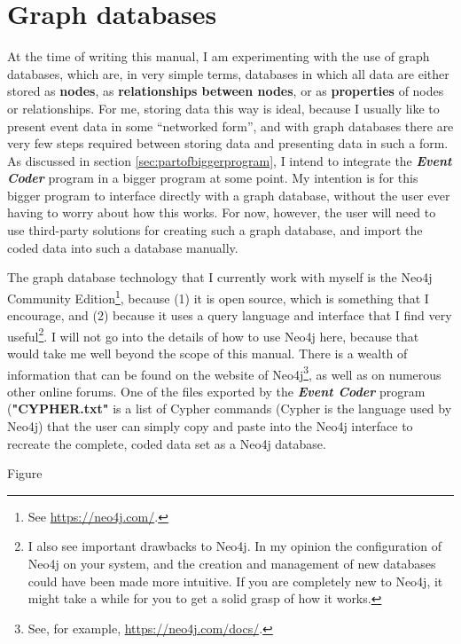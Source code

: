 \documentclass{memoir}
\begin{document}
\section{Graph databases}
\label{sec:graphdatabases}

At the time of writing this manual, I am experimenting with the use of graph databases, which are, in very simple terms, databases in which all data are either stored as \textbf{nodes}, as \textbf{relationships between nodes}, or as \textbf{properties} of nodes or relationships. For me, storing data this way is ideal, because I usually like to present event data in some ``networked form'', and with graph databases there are very few steps required between storing data and presenting data in such a form. As discussed in section \ref{sec:partofbiggerprogram}, I intend to integrate the \textbf{\emph{Event Coder}} program in a bigger program at some point. My intention is for this bigger program to interface directly with a graph database, without the user ever having to worry about how this works. For now, however, the user will need to use third-party solutions for creating such a graph database, and import the coded data into such a database manually.

The graph database technology that I currently work with myself is the Neo4j Community Edition\footnote{See \url{https://neo4j.com/}.}, because (1) it is open source, which is something that I encourage, and (2) because it uses a query language and interface that I find very useful\footnote{I also see important drawbacks to Neo4j. In my opinion the configuration of Neo4j on your system, and the creation and management of new databases could have been made more intuitive. If you are completely new to Neo4j, it might take a while for you to get a solid grasp of how it works.}. I will not go into the details of how to use Neo4j here, because that would take me well beyond the scope of this manual. There is a wealth of information that can be found on the website of Neo4j\footnote{See, for example, \url{https://neo4j.com/docs/}.}, as well as on numerous other online forums. One of the files exported by the \emph{\textbf{Event Coder}} program (\textbf{"CYPHER.txt"} is a list of Cypher commands (Cypher is the language used by Neo4j) that the user can simply copy and paste into the Neo4j interface to recreate the complete, coded data set as a Neo4j database.    

Figure %
\end{document}
